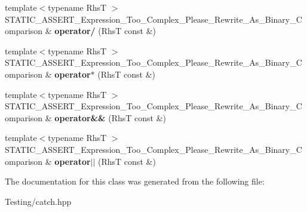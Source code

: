 \begin{DoxyCompactItemize}
\item 
\hypertarget{class_catch_1_1_expression_lhs_a37d50565046ac9b1c9159a7c0cf88a1e}{{\footnotesize template$<$typename Rhs\-T $>$ }\\S\-T\-A\-T\-I\-C\-\_\-\-A\-S\-S\-E\-R\-T\-\_\-\-Expression\-\_\-\-Too\-\_\-\-Complex\-\_\-\-Please\-\_\-\-Rewrite\-\_\-\-As\-\_\-\-Binary\-\_\-\-Comparison \& {\bfseries operator/} (Rhs\-T const \&)}\label{class_catch_1_1_expression_lhs_a37d50565046ac9b1c9159a7c0cf88a1e}

\item 
\hypertarget{class_catch_1_1_expression_lhs_a9a94294c22449f62087862ef911e6291}{{\footnotesize template$<$typename Rhs\-T $>$ }\\S\-T\-A\-T\-I\-C\-\_\-\-A\-S\-S\-E\-R\-T\-\_\-\-Expression\-\_\-\-Too\-\_\-\-Complex\-\_\-\-Please\-\_\-\-Rewrite\-\_\-\-As\-\_\-\-Binary\-\_\-\-Comparison \& {\bfseries operator$\ast$} (Rhs\-T const \&)}\label{class_catch_1_1_expression_lhs_a9a94294c22449f62087862ef911e6291}

\item 
\hypertarget{class_catch_1_1_expression_lhs_a7f022056ef4f25e716ab85846be6229f}{{\footnotesize template$<$typename Rhs\-T $>$ }\\S\-T\-A\-T\-I\-C\-\_\-\-A\-S\-S\-E\-R\-T\-\_\-\-Expression\-\_\-\-Too\-\_\-\-Complex\-\_\-\-Please\-\_\-\-Rewrite\-\_\-\-As\-\_\-\-Binary\-\_\-\-Comparison \& {\bfseries operator\&\&} (Rhs\-T const \&)}\label{class_catch_1_1_expression_lhs_a7f022056ef4f25e716ab85846be6229f}

\item 
\hypertarget{class_catch_1_1_expression_lhs_a6932b72da79d6c6b03d867772ceac61b}{{\footnotesize template$<$typename Rhs\-T $>$ }\\S\-T\-A\-T\-I\-C\-\_\-\-A\-S\-S\-E\-R\-T\-\_\-\-Expression\-\_\-\-Too\-\_\-\-Complex\-\_\-\-Please\-\_\-\-Rewrite\-\_\-\-As\-\_\-\-Binary\-\_\-\-Comparison \& {\bfseries operator$\vert$$\vert$} (Rhs\-T const \&)}\label{class_catch_1_1_expression_lhs_a6932b72da79d6c6b03d867772ceac61b}

\end{DoxyCompactItemize}


The documentation for this class was generated from the following file\-:\begin{DoxyCompactItemize}
\item 
Testing/catch.\-hpp\end{DoxyCompactItemize}

